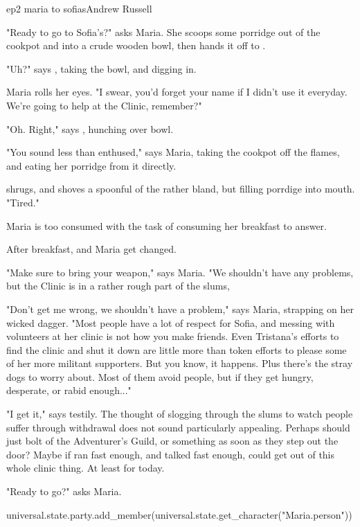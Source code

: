 \documentclass{book}
\begin{document}
\begin{childnode}{ep2 maria to sofias}{Andrew Russell}

    "Ready to go to Sofia's?" asks Maria. She scoops some porridge out of the cookpot and into a crude wooden bowl, then hands it off to \name{}.  

    "Uh?" says \name{}, taking the bowl, and digging in.

    Maria rolls her eyes. "I swear, you'd forget your name if I didn't use it everyday. We're going to help at the Clinic, remember?"

    "Oh. Right," says \name{}, hunching over \hisher{} bowl.

    "You sound less than enthused," says Maria, taking the cookpot off the flames, and eating her porridge from it directly.

    \name{} shrugs, and shoves a spoonful of the rather bland, but filling porrdige into \hisher{} mouth. "Tired."

    Maria is too consumed with the task of consuming her breakfast to answer.

    After breakfast, \name{} and Maria get changed. 

    "Make sure to bring your weapon," says Maria. "We shouldn't have any problems, but the Clinic is in a rather rough part of the slums, 


    "Don't get me wrong, we shouldn't have a problem," says Maria, strapping on her wicked dagger. "Most people have a lot of respect for Sofia, and messing with volunteers at her clinic is not how you make friends. Even Tristana's efforts to find the clinic and shut 
    it down are little more than token 
    efforts to please some of her more militant supporters. But you know, it happens. Plus there's the stray dogs to worry about. Most of them avoid people, but if they get hungry, desperate, or rabid enough..."

    "I get it," says \name{} testily. The thought of slogging through the slums to watch people suffer through withdrawal does not sound particularly appealing. Perhaps \heshe{} should just bolt of the Adventurer's Guild, or something as soon as they step out the 
    door? Maybe if \heshe{} ran fast enough, and talked fast enough, \heshe{} could get out of this whole clinic thing. At least for today.
    
    "Ready to go?" asks Maria.


    \begin{code}
        universal.state.party.add\_member(universal.state.get\_character("Maria.person"))
    \end{code}

\end{childnode}
\end{document}
